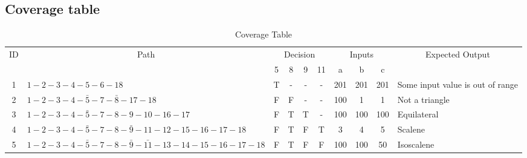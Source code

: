 \documentclass[12pt,a4paper]{article}
\newcommand{\outbound}{Some input value is out of range}
\newcommand{\nottriangle}{Not a triangle}
\newcommand{\equ}{Equilateral}
\newcommand{\sca}{Scalene}
\newcommand{\iso}{Isoscalene}
\begin{document}
\newpage
\begin{landscape}
    \section{Coverage table}

    \begin{table}[hb!]
        \caption{Coverage Table}
        \label{table:coveragetable}
        \begin{center}
            \begin{tabular}[p]{ | c | l | *{7}{c|} l |}
                \hline
                \multirow{2}{*}{ID} & \multicolumn{1}{c}{\multirow{2}{*}{Path}} & \multicolumn{4}{|c|}{Decision} & \multicolumn{3}{|c|}{Inputs} & \multicolumn{1}{c|}{\multirow{2}{*}{Expected Output}} \\ \cline{3-9}
                                    &                                           & 5 & 8 & 9 & 11 & a   & b   & c   &                \\ \hline
                1 & $1-2-3-4-5-6-18$                                            & T & - & - & -  & 201 & 201 & 201 & \outbound      \\ \hline
                2 & $1-2-3-4-\bar{5}-7-\bar{8}-17-18$                           & F & F & - & -  & 100 & 1   & 1   & \nottriangle   \\ \hline
                3 & $1-2-3-4-\bar{5}-7-8-9-10-16-17$                            & F & T & T & -  & 100 & 100 & 100 & \equ           \\ \hline
                4 & $1-2-3-4-\bar{5}-7-8-\bar{9}-11-12-15-16-17-18$             & F & T & F & T  &   3 &   4 &   5 & \sca           \\ \hline
                5 & $1-2-3-4-\bar{5}-7-8-\bar{9}-\bar{11}-13-14-15-16-17-18$    & F & T & F & F  & 100 & 100 &  50 & \iso           \\ \hline
            \end{tabular}
        \end{center}
    \end{table}
\end{landscape}
\end{document}
